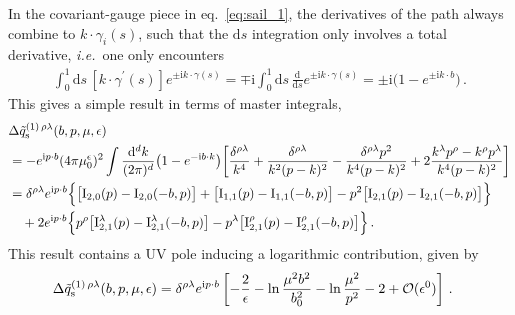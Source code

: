 \documentclass[11pt,a4paper]{article}
\DeclareRobustCommand{\eq}[1]{eq.~\eqref{eq:#1}}
\newcommand{\df}{\mathrm{d}}
\newcommand{\img}{\mathrm{i}}
\newcommand{\eps}{\epsilon}
\newcommand{\cO}{\mathcal{O}}
\newcommand{\nn}{\nonumber}
\newcommand{\pb}{{p{\cdot}b}}
\newcommand{\MI}{\mathbf{\rm I}}
\begin{document}
In the covariant-gauge piece in \eq{sail_1}, the derivatives of the path always combine to $k \cdot \gamma_i(s)$,
such that the $\df s$ integration only involves a total derivative, {\it i.e.}\ one only encounters
\begin{align}
 \int_0^1 \df s \, [k \cdot \gamma^\prime(s)] e^{\pm \img k\cdot\gamma(s)}
 = \mp \img \int_0^1 \df s \, \frac{\df}{\df s} e^{\pm\img k\cdot\gamma(s)}
 = \pm \img \bigl( 1 - e^{\pm\img k \cdot b} \bigr)
\,.\end{align}
This gives a simple result in terms of master integrals,
\begin{align} \label{eq:sail_cov_final}
 &\Delta \tilde q^{(1)\,\rho\lambda}_{\rm s}(b,p,\mu,\eps)
 \nn\\&
 = -e^{\img \pb} (4\pi\mu_0^\eps)^2 \int\frac{\df^d k}{(2\pi)^d} \bigl(1 - e^{-\img b \cdot k}\bigr)
  \biggl[ \frac{\delta^{\rho\lambda}}{k^4} +  \frac{\delta^{\rho\lambda}}{k^2 (p-k)^2} -  \frac{\delta^{\rho\lambda} p^2}{k^4 (p-k)^2} + 2 \frac{k^\lambda p^\rho - k^\rho p^\lambda}{k^4 (p-k)^2} \biggr]
\nn\\&
 = \delta^{\rho\lambda} e^{\img \pb} \Bigl\{ \bigl[\MI_{2,0}(p) - \MI_{2,0}(-b,p)\bigr] + \bigl[\MI_{1,1}(p) - \MI_{1,1}(-b,p) \bigr] - p^2 \bigl[ \MI_{2,1}(p) - \MI_{2,1}(-b,p)\bigr] \Bigr\}
 \nn\\&\quad
 + 2 e^{\img \pb} \Bigl\{ p^\rho \bigl[ \MI_{2,1}^\lambda(p) - \MI_{2,1}^\lambda(-b,p) \bigr] - p^\lambda \bigl[  \MI_{2,1}^\rho(p) -  \MI_{2,1}^\rho(-b,p) \bigr] \Bigr\}
\,.\end{align}
This result contains a UV pole inducing a logarithmic contribution, given by
\begin{align}
 \Delta \tilde q^{(1)\,\rho\lambda}_{\rm s}(b,p,\mu,\eps) &
 = \delta^{\rho\lambda} e^{\img \pb} \left[ - \frac{2}{\eps} - \ln\frac{\mu^2 b^2}{b_0^2} - \ln\frac{\mu^2}{p^2} - 2  + \cO(\eps^0) \right]
\,.\end{align}
\end{document}
